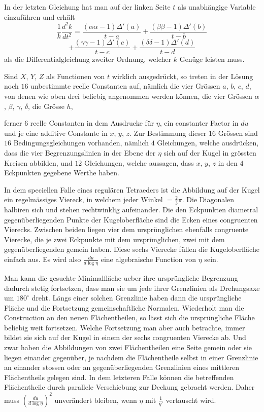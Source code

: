 \documentclass[12pt,a4paper]{article}
\begin{document}
In der letzten Gleichung hat man auf der linken Seite $t$ als unabh\"angige Variable einzuf\"uhren und erh\"alt
\[\frac{1}{k} \frac{d^{2}k}{dt^{2}} = \frac{(\alpha\alpha-1)\varDelta'(a)}{t-a} + \frac{(\beta\beta-1)\varDelta'(b)}{t-b}\]
\[+ \frac{(\gamma\gamma-1)\varDelta'(c)}{t-c} + \frac{(\delta\delta-1)\varDelta'(d)}{t-d}\]
als die Differentialgleichung zweiter Ordnung, welcher $k$ Gen\"uge leisten muss.

Sind $X$, $Y$, $Z$ als Functionen von $t$ wirklich ausgedr\"uckt, so treten in der L\"osung noch $16$ unbestimmte reelle Constanten auf, n\"amlich die vier Gr\"ossen $a$, $b$, $c$, $d$, von denen wie oben drei beliebig angenommen werden k\"onnen, die vier Gr\"ossen $\alpha$, $\beta$, $\gamma$, $\delta$, die Gr\"osse $h$,

\newpage
\noindent ferner $6$ reelle Constanten in dem Ausdrucke f\"ur $\eta$, ein constanter Factor in $du$ und je eine additive Constante in $x$, $y$, $z$. Zur Bestimmung dieser $16$ Gr\"ossen sind $16$ Bedingungsgleichungen vorhanden, n\"amlich $4$ Gleichungen, welche ausdr\"ucken, dass die vier Begrenzungslinien in der Ebene der $\eta$ sich auf der Kugel in gr\"ossten Kreisen abbilden, und $12$ Gleichungen, welche aussagen, dass $x$, $y$, $z$ in den $4$ Eckpunkten gegebene Werthe haben.

In dem speciellen Falle eines regul\"aren Tetraeders ist die Abbildung auf der Kugel ein regelm\"assiges Viereck, in welchem jeder Winkel $= \frac{2}{3}\pi$. Die Diagonalen halbiren sich und stehen rechtwinklig aufeinander. Die den Eckpunkten diametral gegen\"uberliegenden Punkte der Kugeloberfl\"ache sind die Ecken eines congruenten Vierecks. Zwischen beiden liegen vier dem urspr\"unglichen ebenfalls congruente Vierecke, die je zwei Eckpunkte mit dem urspr\"unglichen, zwei mit dem gegen\"uberliegenden gemein haben. Diese sechs Vierecke f\"ullen die Kugeloberfl\"ache einfach aus. Es wird also $\frac{du}{d\log\eta}$ eine algebraische Function von $\eta$ sein.

Man kann die gesuchte Minimalfl\"ache ueber ihre urspr\"ungliche Begrenzung dadurch stetig fortsetzen, dass man sie um jede ihrer Grenzlinien als Drehungsaxe um $180^{\circ}$ dreht. L\"angs einer solchen Grenzlinie haben dann die urspr\"ungliche Fl\"ache und die Fortsetzung gemeinschaftliche Normalen. Wiederholt man die Construction an den neuen Fl\"achentheilen, so l\"asst sich die urspr\"ungliche Fl\"ache beliebig weit fortsetzen. Welche Fortsetzung man aber auch betrachte, immer bildet sie sich auf der Kugel in einem der sechs congruenten Vierecke ab. Und zwar haben die Abbildungen von zwei Fl\"achentheilen eine Seite gemein oder sie liegen einander gegen\"uber, je nachdem die Fl\"achentheile selbst in einer Grenzlinie an einander stossen oder an gegen\"uberliegenden Grenzlinien eines mittleren Fl\"achentheils gelegen sind. In dem letzteren Falle k\"onnen die betreffenden Fl\"achentheile durch parallele Verschiebung zur Deckung gebracht werden. Daher muss $\left(\frac{du}{d\log\eta}\right)^{2}$ unver\"andert bleiben, wenn $\eta$ mit $\frac{1}{\eta'}$ vertauscht wird.
\end{document}
